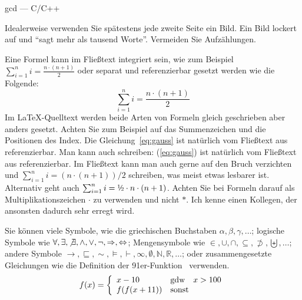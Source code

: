 \documentclass[11pt,a4paper]{report}
\begin{document}
\begin{listing}[htbp]
  \lstset{basicstyle=\ttfamily, columns=[l]flexible, mathescape=true, numbers=left, language=c++}
  
\caption{gcd --- C/C++}
\label{code:gcdcpp}
\end{listing}


Idealerweise verwenden Sie spätestens jede zweite Seite ein Bild. 
Ein Bild lockert auf und "`sagt mehr als tausend Worte"'.
Vermeiden Sie Aufzählungen.



Eine Formel kann im Fließtext integriert sein, wie zum Beispiel 
$\sum_{i=1}^n i = \frac{n \cdot (n+1)}{2}$ oder separat
und referenzierbar gesetzt werden wie die Folgende:
\begin{equation} \label{eq:gauss}
  \sum_{i=1}^n i = \frac{n \cdot (n+1)}{2}
\end{equation}
Im \LaTeX-Quelltext werden beide Arten von Formeln gleich geschrieben 
aber anders gesetzt. 
Achten Sie zum Beispiel auf das Summenzeichen und die Positionen 
des Index. 
Die Gleichung~\ref{eq:gauss} ist natürlich vom Fließtext aus referenzierbar.
Man kann auch schreiben: 
(\ref{eq:gauss}) ist natürlich vom Fließtext aus referenzierbar.
Im Fließtext kann man auch gerne auf den Bruch verzichten und 
$\sum_{i=1}^n i = (n \cdot (n+1))/2$
schreiben, was meist etwas lesbarer ist.
Alternativ geht auch 
$\sum_{i=1}^n i = \mbox{\textonehalf} \cdot n \cdot (n+1)$.
Achten Sie bei Formeln darauf als Multiplikationszeichen 
$\cdot$ zu verwenden und nicht $*$. 
Ich kenne einen Kollegen, der ansonsten dadurch sehr erregt wird. 

Sie können viele Symbole, wie die griechischen Buchstaben 
$\alpha, \beta, \gamma, \ldots$;
logische Symbole wie $\forall, \exists, \not\exists, \wedge, \vee, \neg,
\Rightarrow, \Leftrightarrow$;
Mengensymbole wie $\in, \cup, \cap, \subseteq, \not\supset, 
\biguplus, \ldots$;
andere Symbole $\rightarrow, \sqsubseteq, \sim, 
\models, \vdash, \infty, \emptyset, \mathbb{N}, \mathbb{R}, \ldots$;
oder zusammengesetzte Gleichungen 
wie die Definition der 91er-Funktion~\cite{manna70}
verwenden.
\[
  f(x) = \left\{ \begin{array}{lll}
      x-10 & \mbox{gdw} & x>100 \\
      f(f(x+11)) & \multicolumn{2}{l}{\mbox{sonst}} 
    \end{array} \right.
\]

\end{document}
